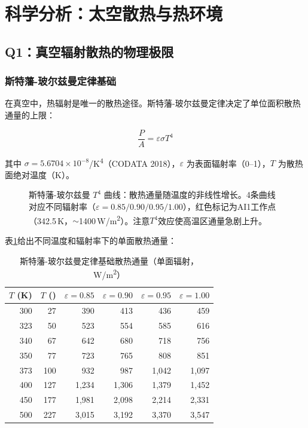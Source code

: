 
\section{科学分析：太空散热与热环境}

\subsection{Q1：真空辐射散热的物理极限}

\subsubsection{斯特藩-玻尔兹曼定律基础}

在真空中，热辐射是唯一的散热途径。斯特藩-玻尔兹曼定律决定了单位面积散热通量的上限：

\begin{equation}
\frac{P}{A} = \varepsilon \sigma T^{4}
\label{eq:sb}
\end{equation}

其中 $\sigma = 5.6704\times10^{-8}$\unitWpm{}/K\textsuperscript{4}（CODATA 2018），$\varepsilon$ 为表面辐射率（0--1），$T$ 为散热面绝对温度（K）。

\begin{figure}[H]
\centering

\caption{斯特藩-玻尔兹曼 $T^{4}$ 曲线：散热通量随温度的非线性增长。4条曲线对应不同辐射率（$\varepsilon=0.85/0.90/0.95/1.00$），红色标记为AI1工作点（342.5\,K，$\sim$1400\,W/m\textsuperscript{2}）。注意$T^{4}$效应使高温区通量急剧上升。}
\label{fig:sb_t4}
\end{figure}

表\ref{tab:sb_basic}给出不同温度和辐射率下的单面散热通量：

\begin{table}[H]
\centering
\footnotesize
\caption{斯特藩-玻尔兹曼定律基础散热通量（单面辐射，W/m\textsuperscript{2}）}
\label{tab:sb_basic}
\begin{tabular}{rrrrrr}
\toprule
$T$ (K) & $T$ (\unitC{}) & $\varepsilon=0.85$ & $\varepsilon=0.90$ & $\varepsilon=0.95$ & $\varepsilon=1.00$ \\
\midrule
300 & 27 & 390 & 413 & 436 & 459 \\
323 & 50 & 523 & 554 & 585 & 616 \\
340 & 67 & 642 & 680 & 718 & 756 \\
350 & 77 & 723 & 765 & 808 & 851 \\
373 & 100 & 932 & 987 & 1,042 & 1,097 \\
400 & 127 & 1,234 & 1,306 & 1,379 & 1,452 \\
450 & 177 & 1,981 & 2,098 & 2,214 & 2,331 \\
500 & 227 & 3,015 & 3,192 & 3,370 & 3,547 \\
\bottomrule
\end{tabular}
\end{table}


